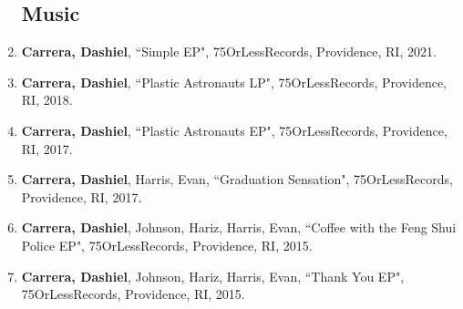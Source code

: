 \begin{enumerate}
\subsection{Music}
\item \textbf{Carrera, Dashiel}, ``Simple EP", 75OrLessRecords, Providence, RI, 2021. \\
\item \textbf{Carrera, Dashiel}, ``Plastic Astronauts LP", 75OrLessRecords, Providence, RI, 2018. \\
\item \textbf{Carrera, Dashiel}, ``Plastic Astronauts EP", 75OrLessRecords, Providence, RI, 2017. \\
\item \textbf{Carrera, Dashiel}, Harris, Evan, ``Graduation Sensation", 75OrLessRecords, Providence, RI, 2017. \\
\item \textbf{Carrera, Dashiel}, Johnson, Hariz, Harris, Evan, ``Coffee with the Feng Shui Police EP", 75OrLessRecords, Providence, RI, 2015. \\
\item \textbf{Carrera, Dashiel}, Johnson, Hariz, Harris, Evan, ``Thank You EP", 75OrLessRecords, Providence, RI, 2015. \\

 \end{enumerate}